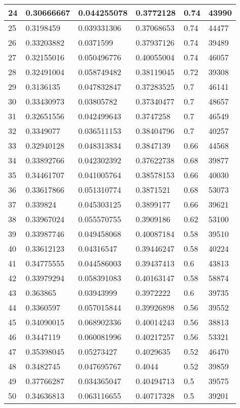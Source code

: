 \begin{longtable}{|l|l|l|l|l|l|}
24 & 0.30666667 & 0.044255078 & 0.3772128 & 0.74 & 43990 \\ \hline 
25 & 0.3198459 & 0.039331306 & 0.37068653 & 0.74 & 44477 \\ \hline 
26 & 0.33203882 & 0.0371599 & 0.37937126 & 0.74 & 39489 \\ \hline 
27 & 0.32155016 & 0.050496776 & 0.40055004 & 0.74 & 46057 \\ \hline 
28 & 0.32491004 & 0.058749482 & 0.38119045 & 0.72 & 39308 \\ \hline 
29 & 0.3136135 & 0.047832847 & 0.37283525 & 0.7 & 46141 \\ \hline 
30 & 0.33430973 & 0.03805782 & 0.37340477 & 0.7 & 48657 \\ \hline 
31 & 0.32651556 & 0.042499643 & 0.3747258 & 0.7 & 46549 \\ \hline 
32 & 0.3349077 & 0.036511153 & 0.38404796 & 0.7 & 40257 \\ \hline 
33 & 0.32940128 & 0.048313834 & 0.3847139 & 0.66 & 44568 \\ \hline 
34 & 0.33892766 & 0.042302392 & 0.37622738 & 0.68 & 39877 \\ \hline 
35 & 0.34461707 & 0.041005764 & 0.38578153 & 0.66 & 40030 \\ \hline 
36 & 0.33617866 & 0.051310774 & 0.3871521 & 0.68 & 53073 \\ \hline 
37 & 0.339824 & 0.045303125 & 0.3899177 & 0.66 & 39621 \\ \hline 
38 & 0.33967024 & 0.055570755 & 0.3909186 & 0.62 & 53100 \\ \hline 
39 & 0.33987746 & 0.049458068 & 0.40087184 & 0.58 & 39510 \\ \hline 
40 & 0.33612123 & 0.04316547 & 0.39446247 & 0.58 & 40224 \\ \hline 
41 & 0.34775555 & 0.044586003 & 0.39437413 & 0.6 & 43813 \\ \hline 
42 & 0.33979294 & 0.058391083 & 0.40163147 & 0.58 & 58874 \\ \hline 
43 & 0.363865 & 0.03943999 & 0.3972222 & 0.6 & 39735 \\ \hline 
44 & 0.3360597 & 0.057015844 & 0.39926898 & 0.56 & 39552 \\ \hline 
45 & 0.34090015 & 0.068902336 & 0.40014243 & 0.56 & 38813 \\ \hline 
46 & 0.3447119 & 0.060081996 & 0.40217257 & 0.56 & 53321 \\ \hline 
47 & 0.35398045 & 0.05273427 & 0.4029635 & 0.52 & 46470 \\ \hline 
48 & 0.3482745 & 0.047695767 & 0.4044 & 0.52 & 39859 \\ \hline 
49 & 0.37766287 & 0.034365047 & 0.40494713 & 0.5 & 39575 \\ \hline 
50 & 0.34636813 & 0.063116655 & 0.40717328 & 0.5 & 39201 \\ \hline 
\end{longtable}